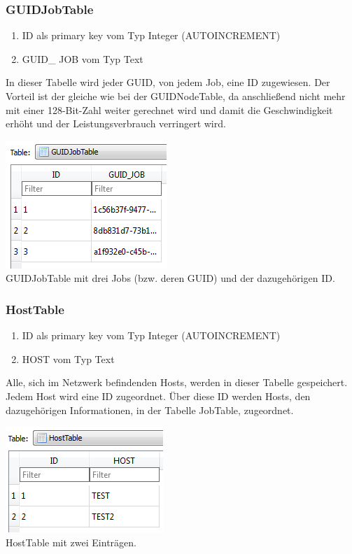 \documentclass[12pt,a4paper]{report}
\begin{document}
\begin{onehalfspace}
\subsubsection{GUIDJobTable}
\begin{enumerate}
\item ID als primary key vom Typ Integer (AUTOINCREMENT)
\item GUID\_ JOB vom Typ Text
\end{enumerate}
In dieser Tabelle wird jeder GUID, von jedem Job, eine ID zugewiesen. Der Vorteil ist der gleiche wie bei der GUIDNodeTable, da anschließend nicht mehr mit einer 128-Bit-Zahl weiter gerechnet wird und damit die Geschwindigkeit erhöht und der Leistungsverbrauch verringert wird.
\begin{center}
\includegraphics[scale=0.8]{img/db-tb-guid-job.png}\\
GUIDJobTable mit drei Jobs (bzw. deren GUID) und der dazugehörigen ID. 
\end{center}
\subsubsection{HostTable}
\begin{enumerate}
\item ID als primary key vom Typ Integer (AUTOINCREMENT)
\item HOST vom Typ Text
\end{enumerate}
Alle, sich im Netzwerk befindenden Hosts, werden in dieser Tabelle gespeichert. Jedem Host wird eine ID zugeordnet. Über diese ID werden Hosts, den dazugehörigen Informationen, in der Tabelle JobTable, zugeordnet.
\begin{center}
\includegraphics[scale=0.8]{img/db-tb-host.png}\\
HostTable mit zwei Einträgen.
\end{center}

\end{onehalfspace}
\end{document}
